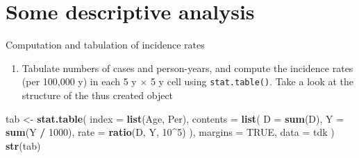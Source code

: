 \documentclass[
]{book}
\newenvironment{Shaded}{\begin{snugshade}}{\end{snugshade}}
\newcommand{\AttributeTok}[1]{\textcolor[rgb]{0.13,0.29,0.53}{#1}}
\newcommand{\ConstantTok}[1]{\textcolor[rgb]{0.56,0.35,0.01}{#1}}
\newcommand{\DecValTok}[1]{\textcolor[rgb]{0.00,0.00,0.81}{#1}}
\newcommand{\FunctionTok}[1]{\textcolor[rgb]{0.13,0.29,0.53}{\textbf{#1}}}
\newcommand{\NormalTok}[1]{#1}
\newcommand{\OtherTok}[1]{\textcolor[rgb]{0.56,0.35,0.01}{#1}}
\newcommand{\SpecialCharTok}[1]{\textcolor[rgb]{0.81,0.36,0.00}{\textbf{#1}}}
\providecommand{\tightlist}{%
  \setlength{\itemsep}{0pt}\setlength{\parskip}{0pt}}
\theoremstyle{definition}
\theoremstyle{definition}
\theoremstyle{definition}
\theoremstyle{definition}
\theoremstyle{remark}
\begin{document}
\begin{Shaded}
\end{Shaded}

\section{Some descriptive analysis}\label{some-descriptive-analysis}

Computation and tabulation of incidence rates

\begin{enumerate}
\def\labelenumi{\arabic{enumi}.}
\tightlist
\item
  Tabulate numbers of cases and person-years, and compute the
  incidence rates (per 100,000 y) in each 5 y \(\times\) 5 y cell using
  \texttt{stat.table()}. Take a look at the structure of the thus created
  object
\end{enumerate}

\begin{Shaded}
\begin{Highlighting}[]
\NormalTok{tab }\OtherTok{\textless{}{-}} \FunctionTok{stat.table}\NormalTok{(}
  \AttributeTok{index =} \FunctionTok{list}\NormalTok{(Age, Per),}
  \AttributeTok{contents =} \FunctionTok{list}\NormalTok{(}
    \AttributeTok{D =} \FunctionTok{sum}\NormalTok{(D),}
    \AttributeTok{Y =} \FunctionTok{sum}\NormalTok{(Y }\SpecialCharTok{/} \DecValTok{1000}\NormalTok{),}
    \AttributeTok{rate =} \FunctionTok{ratio}\NormalTok{(D, Y, }\DecValTok{10}\SpecialCharTok{\^{}}\DecValTok{5}\NormalTok{)}
\NormalTok{  ),}
  \AttributeTok{margins =} \ConstantTok{TRUE}\NormalTok{,}
  \AttributeTok{data =}\NormalTok{ tdk}
\NormalTok{)}
\FunctionTok{str}\NormalTok{(tab)}
\end{Highlighting}
\end{Shaded}
\end{document}
